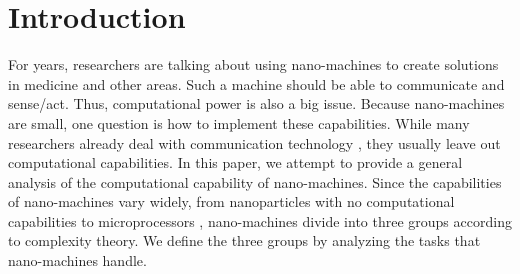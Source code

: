 \documentclass[10pt,sigconf]{acmart}
\begin{document}
\section{Introduction}
For years, researchers are talking about using nano-machines to create solutions in medicine and other areas. Such a machine should be able to communicate and sense/act. Thus, computational power is also a big issue.
Because nano-machines are small, one question is how to implement these capabilities. 
While many researchers already deal with communication technology \cite{akyildiz2008nanonetworks}, they usually leave out computational capabilities.
In this paper, we attempt to provide a general analysis of the computational capability of nano-machines.
Since the capabilities of nano-machines vary widely, from nanoparticles with no computational capabilities to microprocessors \cite{cobo2010bacteria}, nano-machines divide into three groups according to complexity theory.
We define the three groups by analyzing the tasks that nano-machines handle.
\end{document}
